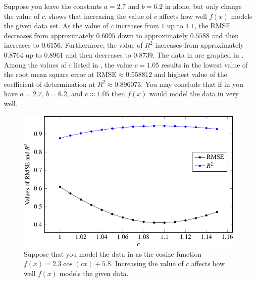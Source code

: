 \documentclass[a4paper,oneside,12pt]{article}
\begin{document}
\begin{problem}
{\begin{solution}
Suppose you leave the constants $a = 2.7$ and $b = 6.2$ in
 alone, but only
change the value of $c$.
 shows that
increasing the value of $c$ affects how well $f(x)$ models the given
data set.  As the value of $c$ increases from $1$ up to $1.1$, the
RMSE decreases from approximately $0.6095$ down to approximately
$0.5588$ and then increases to $0.6156$.  Furthermore, the value of
$R^2$ increases from approximately $0.8764$ up to $0.8961$ and then
decreases to $0.8739$.  The data in
 are graphed in
.  Among the
values of $c$ listed in
, the value
$c = 1.05$ results in the lowest value of the root mean square error
at $\text{RMSE} \approx 0.558812$ and highest value of the coefficient
of determination at $R^2 \approx 0.896073$.  You may conclude that if
in  you have
$a = 2.7$, $b = 6.2$, and $c \approx 1.05$ then $f(x)$ would model the
data in  very well.

\begin{table}[!htbp]
\centering

\caption{%
  Consider the function $f(x) = 2.3 \cos(cx) + 5.8$.  Increasing the
  value of $c$ has the effect of changing the values of the root mean
  square error~(RMSE) and the coefficient of determination of $f(x)$.
}
\label{tab:trigonometric:mean_daily_sunshine_vary_c_ignore_highest}
\end{table}

\begin{figure}[!htbp]
\centering
\includegraphics[scale=1.1]{image/13/sunshine-vary-c-ignore-highest.pdf}
\caption{%
  Suppose that you model the data in
   as the cosine function
  $f(x) = 2.3 \cos(cx) + 5.8$.  Increasing the value of $c$ affects
  how well $f(x)$ models the given data.
}
\label{fig:trigonometric:mean_daily_sunshine_vary_c_ignore_highest}
\end{figure}


\end{solution}}
\end{problem}
\end{document}
